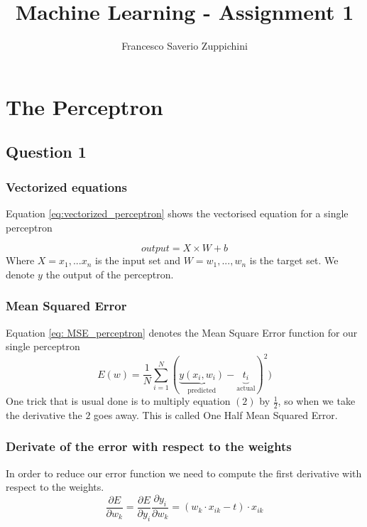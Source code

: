 \documentclass[11pt]{article}
\author{Francesco Saverio Zuppichini}
\title{Machine Learning - Assignment 1}
\begin{document}
\maketitle

\section{The Perceptron}
\subsection{Question 1}
\subsubsection{Vectorized equations}
Equation \ref{eq:vectorized_perceptron} shows the vectorised equation for a single perceptron

\begin{equation}
\label{eq:vectorized_perceptron}
output = X\times W + b
\end{equation}
Where $X = {x_1, ... x_n}$ is the input set and $W = {w_1, ..., w_n}$ is the target set. We denote $y$ the output of the perceptron.

\subsubsection{Mean Squared Error}
Equation \ref{eq: MSE_perceptron} denotes the Mean Square Error function for our single perceptron
\begin{equation}
\label{eq: MSE_perceptron}
	E(w) = \frac{1}{N}\sum_{i = 1}^N(\underbrace{y(x_i,w_i)}_{\text{predicted}} - \underbrace{t_i}_{\text{actual}})^2)
\end{equation}
One trick that is usual done is to multiply equation $(2)$ by $\frac{1}{2}$, so when we take the derivative the $2$ goes away. This is called One Half Mean Squared Error.

\subsubsection{Derivate of the error with respect to the weights}
In order to reduce our error function we need to compute the first derivative with respect to the weights.\begin{equation}
\frac{\partial E}{\partial w_k}	=\frac{\partial E}{\partial y_i}\frac{\partial y_i}{\partial w_k} =  (w_k \cdot x_{ik} - t) \cdot x_{ik}
\end{equation}
\end{document}

